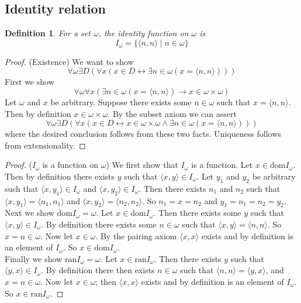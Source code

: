 \documentclass{report}
\newtheorem{definition}[theo]{Definition}
\begin{document}
\subsection{Identity relation}
\begin{definition}
For a set $\omega$, the identity function on $\omega$ is 
\begin{equation*}
I_\omega=\{\langle n,n\rangle\mid n\in\omega\}
\end{equation*}
\end{definition}
\begin{proof}(Existence)
We want to show
\begin{equation*}
\forall\omega\exists D(\forall x(x\in D\leftrightarrow\exists n\in\omega(x=\langle n,n\rangle)))
\end{equation*}
First we show
\begin{equation*}
\forall\omega\forall x(\exists n\in\omega(x=\langle n,n\rangle)\to x\in\omega\times\omega)
\end{equation*}
Let $\omega$ and $x$ be arbitrary. Suppose there exists some $n\in\omega$ such that $x=\langle n,n\rangle$. Then by definition $x\in\omega\times\omega$. 
By the subset axiom we can assert
\begin{equation*}
\forall\omega\exists D(\forall x(x\in D\leftrightarrow x\in\omega\times\omega\land\exists n\in\omega(x=\langle n,n\rangle)))
\end{equation*}
where the desired conclusion follows from these two facts. Uniqueness follows from extensionality.
\end{proof}
\begin{proof}($I_\omega$ is a function on $\omega$) We first show that $I_\omega$ is a function.
Let $x\in\text{dom}I_\omega$. Then by definition there exists $y$ such that $\langle x,y\rangle\in I_\omega$. Let $y_1$ and $y_2$ be arbitrary such that 
$\langle x,y_1\rangle\in I_\omega$ and $\langle x,y_2\rangle\in I_\omega$. Then there exists $n_1$ and $n_2$ such that 
$\langle x,y_1\rangle=\langle n_1,n_1\rangle$ and $\langle x,y_2\rangle=\langle n_2,n_2\rangle$.
So $n_1=x=n_2$ and $y_1=n_1=n_2=y_2$.\\
\indent Next we show $\text{dom}I_\omega=\omega$. Let $x\in\text{dom}I_\omega$. Then there exists some $y$ such that $\langle x,y\rangle\in I_\omega$. By definition there exists some $n\in\omega$
such that $\langle x,y\rangle=\langle n,n\rangle$. So $x=n\in\omega$. Now let $x\in\omega$. By the pairing axiom $\langle x,x\rangle$ exists and by definition is an element of $I_\omega$. 
So $x\in\text{dom}I_\omega$.\\
\indent Finally we show $\text{ran}I_\omega=\omega$. Let $x\in\text{ran}I_\omega$. Then there exists $y$ such that $\langle y,x\rangle\in I_\omega$. By definition there then
exists $n\in\omega$ such that $\langle n,n\rangle=\langle y,x\rangle$, and $x=n\in\omega$. Now let $x\in\omega$; then $\langle x,x\rangle$ exists and by definition is an element of $I_\omega$.
So $x\in\text{ran}I_\omega$.
\end{proof}
\newpage
\end{document}
